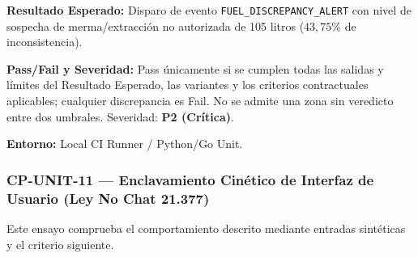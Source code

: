 \par\noindent\textbf{Resultado Esperado:} Disparo de evento \texttt{F\allowbreak{}U\allowbreak{}E\allowbreak{}L\allowbreak{}\_\allowbreak{}D\allowbreak{}I\allowbreak{}S\allowbreak{}C\allowbreak{}R\allowbreak{}E\allowbreak{}P\allowbreak{}A\allowbreak{}N\allowbreak{}C\allowbreak{}Y\allowbreak{}\_\allowbreak{}A\allowbreak{}L\allowbreak{}E\allowbreak{}R\allowbreak{}T\allowbreak{}} con nivel de sospecha de merma/extracción no autorizada de 105 litros (\(43{,}75\%\) de inconsistencia).\par
\par\noindent\textbf{Pass/Fail y Severidad:} Pass únicamente si se cumplen todas las salidas y límites del Resultado Esperado, las variantes y los criterios contractuales aplicables; cualquier discrepancia es Fail. No se admite una zona sin veredicto entre dos umbrales. Severidad: \textbf{P2 (Crítica)}.\par
\par\noindent\textbf{Entorno:} Local CI Runner / Python/Go Unit.\par






\subsubsection*{CP-UNIT-11 — Enclavamiento Cinético de Interfaz de Usuario (Ley No Chat 21.377)}\label{sec:9-cp-unit-11}
Este ensayo comprueba el comportamiento descrito mediante entradas sintéticas y el criterio siguiente.

